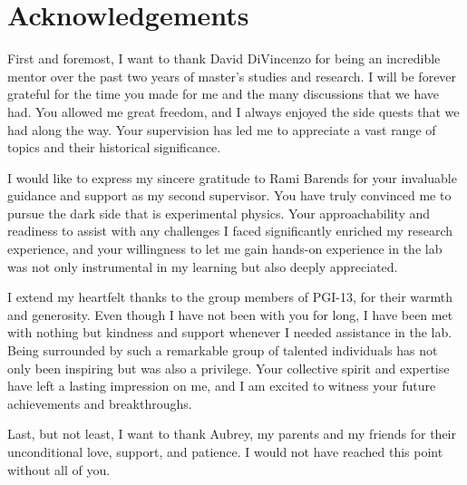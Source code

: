 \chapter{Acknowledgements}

First and foremost, I want to thank David DiVincenzo for being an incredible mentor over the past two years of master’s studies and research. I will be forever grateful for the time you made for me and the many discussions that we have had. You allowed me great freedom, and I always enjoyed the side quests that we had along the way. Your supervision has led me to appreciate a vast range of topics and their historical significance.

I would like to express my sincere gratitude to Rami Barends for your invaluable guidance and support as my second supervisor. You have truly convinced me to pursue the dark side that is experimental physics. Your approachability and readiness to assist with any challenges I faced significantly enriched my research experience, and your willingness to let me gain hands-on experience in the lab was not only instrumental in my learning but also deeply appreciated.

I extend my heartfelt thanks to the group members of PGI-13, for their warmth and generosity. Even though I have not been with you for long, I have been met with nothing but kindness and support whenever I needed assistance in the lab. Being surrounded by such a remarkable group of talented individuals has not only been inspiring but was also a privilege. Your collective spirit and expertise have left a lasting impression on me, and I am excited to witness your future achievements and breakthroughs. 

Last, but not least, I want to thank Aubrey, my parents and my friends for their unconditional love, support, and patience. I would not have reached this point without all of you.
